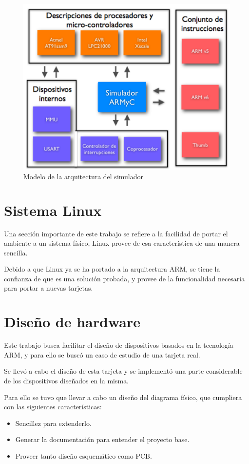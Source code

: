 \begin{figure}
\includegraphics[scale=0.7]{img/figura_arq}\caption{Modelo de la arquitectura del simulador}
\label{Flo:figura_arq}
\end{figure}

\section{Sistema Linux}

Una sección importante de este trabajo se refiere a la facilidad de portar el ambiente a un sistema físico, Linux provee de esa característica de una manera sencilla.

Debido a que Linux ya se ha portado a la arquitectura ARM, se tiene la confianza de que es una solución probada, y provee de la funcionalidad necesaria para portar a nuevas tarjetas.

\section{Dise\~no de hardware}

Este trabajo busca facilitar el diseño de dispositivos basados en la tecnología ARM, y para ello se buscó un caso de estudio de una tarjeta real.

Se llevó a cabo el diseño de esta tarjeta y se implementó una parte considerable de los dispositivos diseñados en la misma.

Para ello se tuvo que llevar a cabo un diseño del diagrama físico, que cumpliera con las siguientes características:

\begin{itemize}
\item Sencillez para extenderlo.
\item Generar la documentación para entender el proyecto base.
\item Proveer tanto diseño esquemático como PCB.
\end{itemize}

